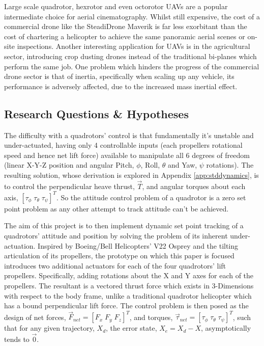 \par
Large scale quadrotor, hexrotor and even octorotor UAVs are a popular intermediate choice for aerial cinematography.  Whilst still expensive, the cost of a commercial drone like the SteadiDrone Maverik \cite{steadidrone} is far less exorbitant than the cost of chartering a helicopter to achieve the same panoramic aerial scenes or on-site inspections. Another interesting application for UAVs is in the agricultural sector, introducing crop dusting drones instead of the traditional bi-planes which perform the same job. One problem which hinders the progress of the commercial drone sector is that of inertia, specifically when scaling up any vehicle, its performance is adversely affected, due to the increased mass inertial effect.
\subsection{Research Questions \& Hypotheses}
\label{subsec:intro.foreword.hypotheses}
The difficulty with a quadrotors' control is that fundamentally it's unstable and under-actuated, having only 4 controllable inputs (each propellers rotational speed and hence net lift force) available to manipulate all 6 degrees of freedom (linear X-Y-Z position and angular Pitch, $\phi$, Roll, $\theta$ and Yaw, $\psi$ rotations). The resulting solution, whose derivation is explored in Appendix \ref{app:stddynamics}, is to control the perpendicular heave thrust, $\vec{T}$, and angular torques about each axis, $[\tau_\phi\;\tau_\theta\;\tau_\psi]^T$. So the attitude control problem of a quadrotor is a zero set point problem as any other attempt to track attitude can't be achieved.
\par
The aim of this project is to then implement dynamic set point tracking of a quadrotors' attitude and position by solving the problem of its inherent under-actuation. Inspired by Boeing/Bell Helicopters' V22 Osprey and the tilting articulation of its propellers, the prototype on which this paper is focused introduces two additional actuators for each of the four quadrotors' lift propellers. Specifically, adding rotations about the X and Y axes for each of the propellers. The resultant is a vectored thrust force which exists in 3-Dimensions with respect to the body frame, unlike a traditional quadrotor helicopter which has a bound perpendicular lift force. The control problem is then posed as the design of net forces, $\vec{F}_{net} = [F_x\;F_y\;F_z]^T$, and torques, $\vec{\tau}_{net} = [\tau_{\phi}\;\tau_{\theta}\;\tau_{\psi}]^T$, such that for any given trajectory, $X_d$, the error state, $X_e = X_d - X$, asymptotically tends to $\vec{0}$.

